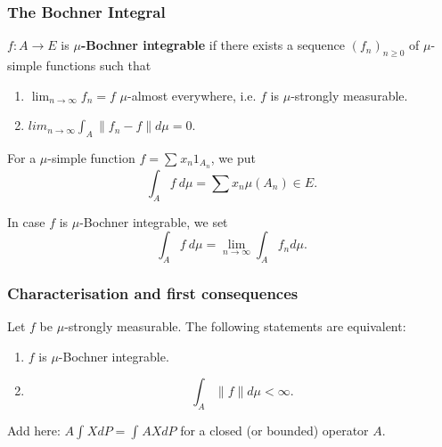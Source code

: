 \begin{frame}
    \frametitle{The Bochner Integral}
    
    $f: A \to E$ is \textbf{$\mu$-Bochner integrable} if there exists a sequence 
    $(f_n)_{n\geq 0}$ of $\mu$-simple functions such that
    \begin{enumerate}
        \item $\lim_{n\to \infty} f_n = f$ $\mu$-almost everywhere, 
            i.e. $f$ is $\mu$-strongly measurable.
        \item $lim_{n\to \infty} \int_A \| f_n - f  \| d \mu = 0$.
    \end{enumerate}

    For a $\mu$-simple function $f = \sum_{}^{} x_n 1_{A_n}$, we put 
    \begin{equation*}
        \int_{A}^{} f \ d\mu = \sum_{}^{} x_n \mu(A_n) \in E. 
    \end{equation*}
    
    In case $f$ is $\mu$-Bochner integrable, we set 
    \begin{equation*}
        \int_{A}^{} f \ d\mu = \lim_{n\to \infty} \int_{A}^{} f_n d \mu.
    \end{equation*}
\end{frame}


\begin{frame}
    \frametitle{Characterisation and first consequences}
    
    Let $f$ be $\mu$-strongly measurable. The following statements are equivalent:
    \begin{enumerate}
        \item $f$ is $\mu$-Bochner integrable. 
        \item \begin{equation*}
                \int_{A}^{} \| f \| d\mu < \infty.
            \end{equation*}
    \end{enumerate}

    Add here: $A \int_{}^{} X dP = \int_{}^{} AX d P$ for a closed (or bounded) operator $A$. 
\end{frame}



